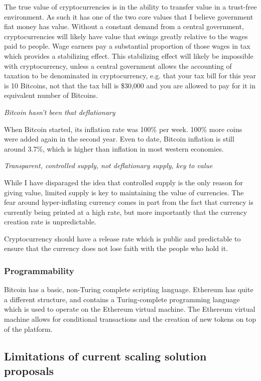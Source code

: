 \documentclass[a4paper,12pt]{article}
\begin{document}
The true value of cryptocurrencies is in the ability to transfer value in a trust-free environment. As such it has one of the two core values that I believe government fiat money has value. Without a constant demand from a central government, cryptocurrencies will likely have value that swings greatly relative to the wages paid to people. Wage earners pay a substantial proportion of those wages in tax which provides a stabilizing effect. This stabilizing effect will likely be impossible with cryptocurrency, unless a central government allows the accounting of taxation to be denominated in cryptocurrency, e.g. that your tax bill for this year is 10 Bitcoins, not that the tax bill is \$30,000 and you are allowed to pay for it in equivalent number of Bitcoins.

\textit{Bitcoin hasn't been that deflationary}

When Bitcoin started, its inflation rate was 100\% per week. 100\% more coins were added again in the second year. Even to date, Bitcoin inflation is still around 3.7\%, which is higher than inflation in most western economies.

\textit{Transparent, controlled supply, not deflationary supply, key to value}

While I have disparaged the idea that controlled supply is the only reason for giving value, limited supply is key to maintaining the value of currencies. The fear around hyper-inflating currency comes in part from the fact that currency is currently being printed at a high rate, but more importantly that the currency creation rate is unpredictable. 

Cryptocurrency should have a release rate which is public and predictable to ensure that the currency does not lose faith with the people who hold it. 

\subsubsection{Programmability}
Bitcoin has a basic, non-Turing complete scripting language. Ethereum has quite a different structure, and contains a Turing-complete programming language which is used to operate on the Ethereum virtual machine. The Ethereum virtual machine allows for conditional transactions and the creation of new tokens on top of the platform. 

\subsection{Limitations of current scaling solution proposals}
\end{document}
